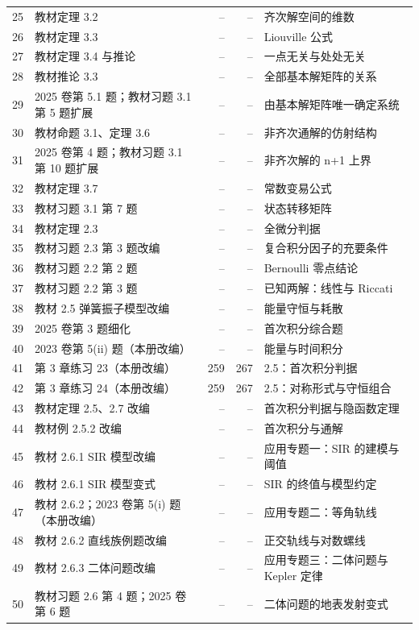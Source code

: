 \begin{longtable}{r p{.30\linewidth}rr p{.33\linewidth}}
25 & 教材定理 3.2 & -- & -- & 齐次解空间的维数\\
26 & 教材定理 3.3 & -- & -- & Liouville 公式\\
27 & 教材定理 3.4 与推论 & -- & -- & 一点无关与处处无关\\
28 & 教材推论 3.3 & -- & -- & 全部基本解矩阵的关系\\
29 & 2025 卷第 5.1 题；教材习题 3.1 第 5 题扩展 & -- & -- & 由基本解矩阵唯一确定系统\\
30 & 教材命题 3.1、定理 3.6 & -- & -- & 非齐次通解的仿射结构\\
31 & 2025 卷第 4 题；教材习题 3.1 第 10 题扩展 & -- & -- & 非齐次解的 n+1 上界\\
32 & 教材定理 3.7 & -- & -- & 常数变易公式\\
33 & 教材习题 3.1 第 7 题 & -- & -- & 状态转移矩阵\\
34 & 教材定理 2.3 & -- & -- & 全微分判据\\
35 & 教材习题 2.3 第 3 题改编 & -- & -- & 复合积分因子的充要条件\\
36 & 教材习题 2.2 第 2 题 & -- & -- & Bernoulli 零点结论\\
37 & 教材习题 2.2 第 3 题 & -- & -- & 已知两解：线性与 Riccati\\
38 & 教材 2.5 弹簧振子模型改编 & -- & -- & 能量守恒与耗散\\
39 & 2025 卷第 3 题细化 & -- & -- & 首次积分综合题\\
40 & 2023 卷第 5(ii) 题（本册改编） & -- & -- & 能量与时间积分\\
41 & 第 3 章练习 23（本册改编） & 259 & 267 & 2.5：首次积分判据\\
42 & 第 3 章练习 24（本册改编） & 259 & 267 & 2.5：对称形式与守恒组合\\
43 & 教材定理 2.5、2.7 改编 & -- & -- & 首次积分判据与隐函数定理\\
44 & 教材例 2.5.2 改编 & -- & -- & 首次积分与通解\\
45 & 教材 2.6.1 SIR 模型改编 & -- & -- & 应用专题一：SIR 的建模与阈值\\
46 & 教材 2.6.1 SIR 模型变式 & -- & -- & SIR 的终值与模型约定\\
47 & 教材 2.6.2；2023 卷第 5(i) 题（本册改编） & -- & -- & 应用专题二：等角轨线\\
48 & 教材 2.6.2 直线族例题改编 & -- & -- & 正交轨线与对数螺线\\
49 & 教材 2.6.3 二体问题改编 & -- & -- & 应用专题三：二体问题与 Kepler 定律\\
50 & 教材习题 2.6 第 4 题；2025 卷第 6 题 & -- & -- & 二体问题的地表发射变式\\

\end{longtable}
